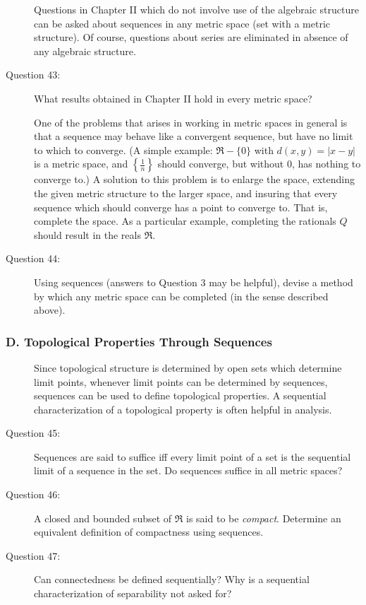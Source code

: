 \documentclass{article}
\begin{document}
\begin{description}

  \item[] Questions in Chapter II which do not involve use of the algebraic structure can be asked about sequences in any metric space (set with a metric structure). Of course, questions about series are eliminated in absence of any algebraic structure.

  \item[Question 43:] What results obtained in Chapter II hold in every metric space?

  \item[] One of the problems that arises in working in metric spaces in general is that a sequence may behave like a convergent sequence, but have no limit to which to converge. (A simple example: $\Re - \{ 0 \}$ with $d(x,y) = |x-y|$ is a metric space, and $\left\{ \frac{1}{n} \right\}$ should converge, but without $0$, has nothing to converge to.) A solution to this problem is to enlarge the space, extending the given metric structure to the larger space, and insuring that every sequence which should converge has a point to converge to. That is, complete the space. As a particular example, completing the rationals $Q$ should result in the reals $\Re$.

  \item[Question 44:] Using sequences (answers to Question 3 may be helpful), devise a method by which any metric space can be completed (in the sense described above).

\end{description}


\subsubsection*{D. Topological Properties Through Sequences}

\begin{description}

  \item[] Since topological structure is determined by open sets which determine limit points, whenever limit points can be determined by sequences, sequences can be used to define topological properties. A sequential characterization of a topological property is often helpful in analysis.

  \item[Question 45:] Sequences are said to suffice iff every limit point of a set is the sequential limit of a sequence in the set. Do sequences suffice in all metric spaces?

  \item[Question 46:] A closed and bounded subset of $\Re$ is said to be \emph{compact}. Determine an equivalent definition of compactness using sequences.

  \item[Question 47:] Can connectedness be defined sequentially? Why is a sequential characterization of separability not asked for?

\end{description}
\end{document}
